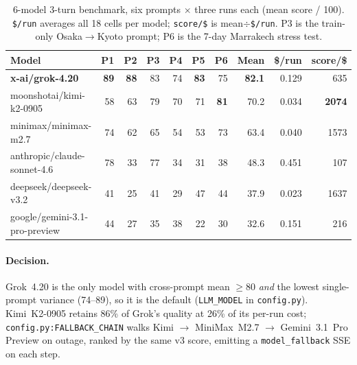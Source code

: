 \documentclass{article}
\begin{document}
\begin{table}[H]
\caption{6-model 3-turn benchmark, six prompts $\times$ three runs each
(mean score / 100). \texttt{\$/run} averages all 18 cells per model;
\texttt{score/\$} is mean$\div$\texttt{\$/run}. P3 is the train-only
Osaka$\to$Kyoto prompt; P6 is the 7-day Marrakech stress test.}
\label{tab:bench}
\centering
\renewcommand{\arraystretch}{0.95}
\setlength{\tabcolsep}{4pt}
\small
\begin{tabular}{@{}lrrrrrrrrr@{}}
\toprule
\textbf{Model} & \textbf{P1} & \textbf{P2} & \textbf{P3} & \textbf{P4} & \textbf{P5} & \textbf{P6} & \textbf{Mean} & \textbf{\$/run} & \textbf{score/\$}\\
\midrule
\textbf{x-ai/grok-4.20}        & \textbf{89} & \textbf{88} & 83 & 74 & \textbf{83} & 75 & \textbf{82.1} & 0.129 & 635\\
moonshotai/kimi-k2-0905        & 58          & 63          & 79 & 70 & 71          & \textbf{81} & 70.2 & 0.034 & \textbf{2074}\\
minimax/minimax-m2.7           & 74          & 62          & 65 & 54 & 53          & 73          & 63.4 & 0.040 & 1573\\
anthropic/claude-sonnet-4.6    & 78          & 33          & 77 & 34 & 31          & 38          & 48.3 & 0.451 & 107\\
deepseek/deepseek-v3.2         & 41          & 25          & 41 & 29 & 47          & 44          & 37.9 & 0.023 & 1637\\
google/gemini-3.1-pro-preview  & 44          & 27          & 35 & 38 & 22          & 30          & 32.6 & 0.151 & 216\\
\bottomrule
\end{tabular}
\end{table}

\paragraph{Decision.} Grok~4.20 is the only model with cross-prompt
mean $\ge$80 \emph{and} the lowest single-prompt variance (74--89), so
it is the default (\texttt{LLM\_MODEL} in \texttt{config.py}).
Kimi~K2-0905 retains 86\% of Grok's quality at 26\% of its per-run
cost; \texttt{config.py:FALLBACK\_CHAIN} walks Kimi $\to$ MiniMax~M2.7
$\to$ Gemini~3.1~Pro Preview on outage, ranked by the same v3 score,
emitting a \texttt{model\_fallback} SSE on each step.
\end{document}
